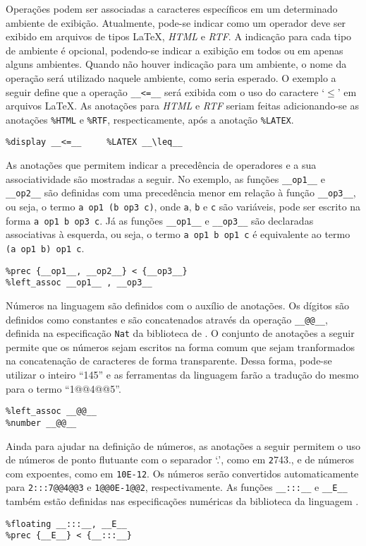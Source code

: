 Operações podem ser associadas a caracteres específicos em um determinado ambiente de exibição.
Atualmente, pode-se indicar como um operador deve ser exibido em arquivos de tipos \LaTeX, \textit{HTML} e \textit{RTF}.
A indicação para cada tipo de ambiente é opcional, podendo-se indicar a exibição em todos ou em apenas alguns ambientes.
Quando não houver indicação para um ambiente, o nome da operação será utilizado naquele ambiente, como seria esperado.
O exemplo a seguir define que a operação \Verb.__<=__. será exibida com o uso do caractere `$\leq$' em arquivos \LaTeX.
As anotações para \textit{HTML} e \textit{RTF} seriam feitas adicionando-se as anotações \Verb.%
\begin{Verbatim}
%display __<=__     %LATEX __\leq__
\end{Verbatim}

As anotações que permitem indicar a precedência de operadores e a sua associatividade são mostradas a seguir.
No exemplo, as funções \Verb.__op1__. e \Verb.__op2__. são definidas com uma precedência menor em relação à função \Verb.__op3__., ou seja, o termo \Verb.a op1 (b op3 c)., onde \Verb.a., \Verb.b. e \Verb.c. são variáveis, pode ser escrito na forma \Verb.a op1 b op3 c..
Já as funções \Verb.__op1__. e \Verb.__op3__. são declaradas associativas à esquerda, ou seja, o termo \Verb.a op1 b op1 c. é equivalente ao termo \Verb.(a op1 b) op1 c..
\begin{Verbatim}
%prec {__op1__, __op2__} < {__op3__}
%left_assoc __op1__ , __op3__
\end{Verbatim}

Números na linguagem \CASL são definidos com o auxílio de anotações.
Os dígitos são definidos como constantes e são concatenados através da operação \Verb.__@@__., definida na especificação \Verb.Nat. da biblioteca de \CASL.
O conjunto de anotações a seguir permite que os números sejam escritos na forma comum que sejam tranformados na concatenação de caracteres de forma transparente.
Dessa forma, pode-se utilizar o inteiro ``145'' e as ferramentas da linguagem farão a tradução do mesmo para o termo ``1@@4@@5''.
\begin{Verbatim}
%left_assoc __@@__
%number __@@__
\end{Verbatim}

Ainda para ajudar na definição de números, as anotações a seguir permitem o uso de números de ponto flutuante com o separador `.', como em \Verb.2.743., e de números com expoentes, como em \Verb.10E-12..
Os números serão convertidos automaticamente para \Verb.2:::7@@4@@3. e \Verb.1@@0E-1@@2., respectivamente.
As funções \Verb.__:::__. e \Verb.__E__. também estão definidas nas especificações numéricas da biblioteca da linguagem \CASL.
\begin{Verbatim}
%floating __:::__, __E__
%prec {__E__} < {__:::__}
\end{Verbatim}

